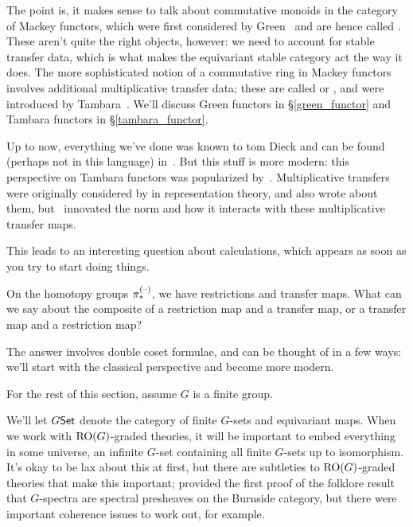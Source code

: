 The point is, it makes sense to talk about commutative monoids in the category of Mackey functors, which were first
considered by Green~\cite{Green} and are hence called . These aren't quite the right objects,
however: we need to account for stable transfer data, which is what makes the equivariant stable category act the
way it does. The more sophisticated notion of a commutative ring in Mackey functors involves additional
multiplicative transfer data; these are called  or , and were
introduced by Tambara~\cite{Tambara}. We'll discuss Green functors in \S\ref{green_functor} and Tambara functors
in \S\ref{tambara_functor}.

Up to now, everything we've done was known to tom Dieck and can be found (perhaps not in this language)
in~\cite{LMS}. But this stuff is more modern: this perspective on Tambara functors was popularized by~\cite{HHR}.
Multiplicative transfers were originally considered by \cite{Evens} in representation theory, and
\cite{GreenleesMay} also wrote about them, but~\cite{HHR} innovated the norm and how it interacts with these
multiplicative transfer maps.

This leads to an interesting question about calculations, which appears as soon as you try to start doing things.
\begin{ques}
On the homotopy groups $\pi_*^{(\text{--})}$, we have restrictions and transfer maps. What can we say about the composite of
a restriction map and a transfer map, or a transfer map and a restriction map?
\end{ques}
The answer involves double coset formulae, and can be thought of in a few ways: we'll start with the classical
perspective and become more modern.

For the rest of this section, assume $G$ is a finite group.

We'll let $G\mathsf{Set}$ denote the category of finite $G$-sets and equivariant maps. When we work with $\mathrm{RO}(G)$-graded
theories, it will be important to embed everything in some universe, an infinite $G$-set containing all finite
$G$-sets up to isomorphism. It's okay to be lax about this at first, but there are subtleties to $\mathrm{RO}(G)$-graded
theories that make this important; \cite{GuillouMay} provided the first proof of the folklore result that
$G$-spectra are spectral presheaves on the Burnside category, but there were important coherence issues to work
out, for example.

